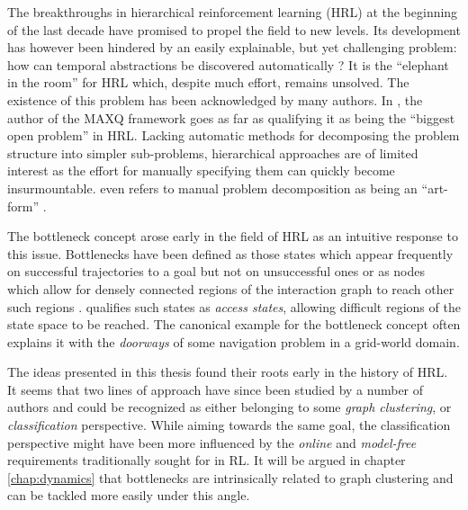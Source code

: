 The breakthroughs in hierarchical reinforcement learning (HRL) at the beginning of the last decade have promised to propel the field to new levels. Its development has however been hindered by an easily explainable, but yet challenging problem: how can temporal abstractions be discovered automatically ? It is the ``elephant in the room'' for HRL which, despite much effort, remains unsolved. The existence of this problem has been acknowledged by many authors. In \cite{Dietterich2000}, the author of the \textsc{MAXQ} framework  goes as far as qualifying it as being the ``biggest open problem'' in HRL. Lacking automatic methods for decomposing the problem structure into simpler sub-problems, hierarchical approaches are of limited interest as the effort for manually specifying them can quickly become insurmountable. \cite{Hengst2002} even refers to manual problem decomposition as being an ``art-form'' .

The bottleneck concept arose early in the field of HRL as an intuitive response to this issue. Bottlenecks have been defined as those states which appear frequently on successful trajectories to a goal but not on unsuccessful ones \parencite{Mcgovern2001, Stolle2002} or as nodes which allow for densely connected regions of the interaction graph to reach other such regions \parencite{Menache2002, Simsek2004, Kazemitabar2009}. \cite{Simsek2004} qualifies such states as \textit{access states}, allowing difficult regions of the state space to be reached. The canonical example for the bottleneck concept often explains it with the \textit{doorways} of some navigation problem in a grid-world domain.

The ideas presented in this thesis found their roots early in the history of HRL. It seems that two lines of approach have since been studied by a number of authors and could be recognized as either belonging to some \textit{graph clustering}, or  \textit{classification} perspective. While aiming towards the same goal, the classification perspective might have been more influenced by the \textit{online} and \textit{model-free} requirements  traditionally sought for in RL. It will be argued in chapter \ref{chap:dynamics}  that bottlenecks are intrinsically related to graph clustering and can be tackled more easily under this angle. 


